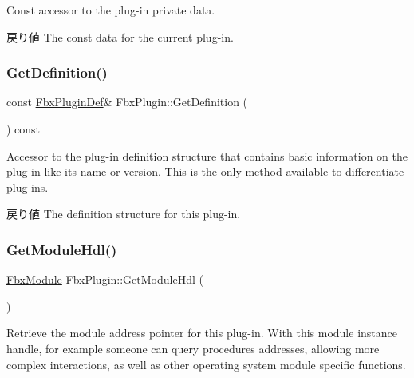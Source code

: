 Const accessor to the plug-\/in private data. \begin{DoxyReturn}{戻り値}
The const data for the current plug-\/in. 
\end{DoxyReturn}
\mbox{\label{class_fbx_plugin_a2827e6fbb16ac3c80a2e9a50c34201c5}} 
\subsubsection{\texorpdfstring{Get\+Definition()}{GetDefinition()}}
{\footnotesize\ttfamily const \hyperlink{struct_fbx_plugin_def}{Fbx\+Plugin\+Def}\& Fbx\+Plugin\+::\+Get\+Definition (\begin{DoxyParamCaption}{ }\end{DoxyParamCaption}) const}

Accessor to the plug-\/in definition structure that contains basic information on the plug-\/in like its name or version. This is the only method available to differentiate plug-\/ins. \begin{DoxyReturn}{戻り値}
The definition structure for this plug-\/in. 
\end{DoxyReturn}
\mbox{\label{class_fbx_plugin_ae50021560acfbc6a4d924cae16d5414b}} 
\subsubsection{\texorpdfstring{Get\+Module\+Hdl()}{GetModuleHdl()}}
{\footnotesize\ttfamily \hyperlink{fbxmodule_8h_a1d2ed3e9ccb8075d585f7cb7bdf40420}{Fbx\+Module} Fbx\+Plugin\+::\+Get\+Module\+Hdl (\begin{DoxyParamCaption}{ }\end{DoxyParamCaption})}

Retrieve the module address pointer for this plug-\/in. With this module instance handle, for example someone can query procedures addresses, allowing more complex interactions, as well as other operating system module specific functions. \mbox{\label{class_fbx_plugin_aae9cc7178878f2350538b74e183f46cb}} 
